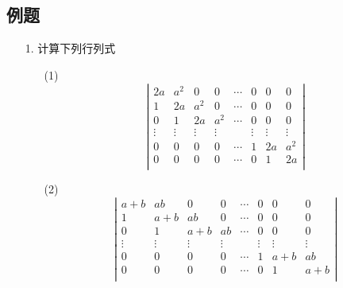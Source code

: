 \subsection*{例题}
\begin{itemize}
    \item[1.] 计算下列行列式
    \begin{itemize}
        \item[(1)]
        \begin{equation}
        \nonumber
        \left|
            \begin{array}{cccccccc}
            2a      &a^2     &0       &0      &\cdots & 0 &0 &0\\
            1       &2a      &a^2     &0      &\cdots & 0 &0 &0\\
            0       &1       &2a      &a^2    &\cdots & 0 &0 &0\\
            \vdots  &\vdots  &\vdots  &\vdots &       & \vdots & \vdots &\vdots\\
            0       &0       &0       &0      &\cdots & 1 &2a &a^2\\
            0       &0       &0       &0      &\cdots & 0 &1 &2a\\
            \end{array}
        \right|
        \end{equation} 
        \vspace{2cm}

        \item[(2)]
        \begin{equation}
        \nonumber
        \left|
            \begin{array}{cccccccc}
            a+b      &ab     &0       &0      &\cdots & 0 &0 &0\\
            1       &a+b     &ab     &0      &\cdots & 0 &0 &0\\
            0       &1       &a+b      &ab    &\cdots & 0 &0 &0\\
            \vdots  &\vdots  &\vdots  &\vdots &       & \vdots & \vdots &\vdots\\
            0       &0       &0       &0      &\cdots & 1 &a+b &ab\\
            0       &0       &0       &0      &\cdots & 0 &1 &a+b\\
            \end{array}
        \right|
        \end{equation} 
        \vspace{2cm}


\end{itemize}
\end{itemize}
